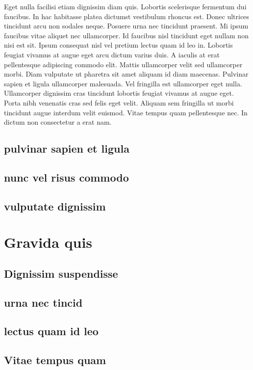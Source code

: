 \documentclass[10pt, a4paper]{article}
\numberwithin{equation}{section}
\begin{document}
Eget nulla facilisi etiam dignissim diam quis. Lobortis scelerisque fermentum dui faucibus. In hac habitasse platea dictumst vestibulum rhoncus est. Donec ultrices tincidunt arcu non sodales neque. Posuere urna nec tincidunt praesent. Mi ipsum faucibus vitae aliquet nec ullamcorper. Id faucibus nisl tincidunt eget nullam non nisi est sit. Ipsum consequat nisl vel pretium lectus quam id leo in. Lobortis feugiat vivamus at augue eget arcu dictum varius duis. A iaculis at erat pellentesque adipiscing commodo elit. Mattis ullamcorper velit sed ullamcorper morbi. Diam vulputate ut pharetra sit amet aliquam id diam maecenas. Pulvinar sapien et ligula ullamcorper malesuada. Vel fringilla est ullamcorper eget nulla. Ullamcorper dignissim cras tincidunt lobortis feugiat vivamus at augue eget. Porta nibh venenatis cras sed felis eget velit. Aliquam sem fringilla ut morbi tincidunt augue interdum velit euismod. Vitae tempus quam pellentesque nec. In dictum non consectetur a erat nam.

\subsection{pulvinar sapien et ligula}
\subsection{nunc vel risus commodo}
\subsection{vulputate dignissim}

\section{Gravida quis}

\subsection{Dignissim suspendisse}
\subsection{urna nec tincid}
\subsection{lectus quam id leo}
\subsection{Vitae tempus quam}
\end{document}
